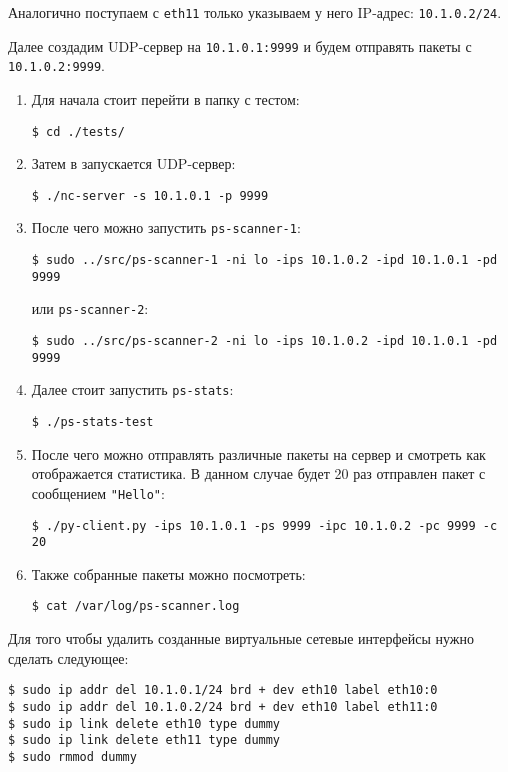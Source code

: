 \linespace

Аналогично поступаем с \verb|eth11| только указываем у него IP-адрес: \verb|10.1.0.2/24|.

\linespace

Далее создадим UDP-сервер на \verb|10.1.0.1:9999| и будем отправять пакеты с \verb|10.1.0.2:9999|.

\begin{enumerate}
\item Для начала стоит перейти в папку с тестом:
\begin{lstlisting}
$ cd ./tests/
\end{lstlisting}

\item Затем в запускается UDP-сервер:
\begin{lstlisting}
$ ./nc-server -s 10.1.0.1 -p 9999
\end{lstlisting}

\item После чего можно запустить \verb|ps-scanner-1|:
\begin{lstlisting}
$ sudo ../src/ps-scanner-1 -ni lo -ips 10.1.0.2 -ipd 10.1.0.1 -pd 9999
\end{lstlisting}
или \verb|ps-scanner-2|:
\begin{lstlisting}
$ sudo ../src/ps-scanner-2 -ni lo -ips 10.1.0.2 -ipd 10.1.0.1 -pd 9999
\end{lstlisting}

\item Далее стоит запустить \verb|ps-stats|:
\begin{lstlisting}
$ ./ps-stats-test
\end{lstlisting}

\newpage

\item После чего можно отправлять различные пакеты на сервер и смотреть как отображается статистика. В данном случае будет 20 раз отправлен пакет с сообщением \verb|"Hello"|:
\begin{lstlisting}
$ ./py-client.py -ips 10.1.0.1 -ps 9999 -ipc 10.1.0.2 -pc 9999 -c 20
\end{lstlisting}

\item Также собранные пакеты можно посмотреть:
\begin{lstlisting}
$ cat /var/log/ps-scanner.log
\end{lstlisting}
\end{enumerate}

\linespace

Для того чтобы удалить созданные виртуальные сетевые интерфейсы нужно сделать следующее:
\begin{lstlisting}
$ sudo ip addr del 10.1.0.1/24 brd + dev eth10 label eth10:0
$ sudo ip addr del 10.1.0.2/24 brd + dev eth10 label eth11:0
$ sudo ip link delete eth10 type dummy
$ sudo ip link delete eth11 type dummy
$ sudo rmmod dummy
\end{lstlisting}
